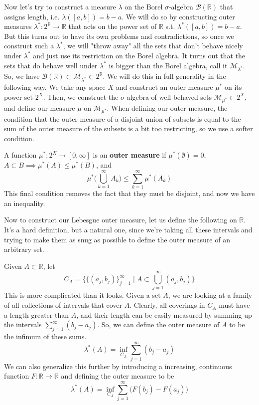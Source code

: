 \documentclass{article}
\begin{document}
Now let's try to construct a measure $\lambda$ on the Borel $\sigma$-algebra $\mathcal{B}(\mathbb{R})$ that assigns length, i.e. $\lambda([a, b]) = b - a$. We will do so by constructing outer measures $\lambda^*: 2^\mathbb{R} \longrightarrow \mathbb{R}$ that acts on the power set of $\mathbb{R}$ s.t. $\lambda^*([a, b]) = b - a$. But this turns out to have its own problems and contradictions, so once we construct such a $\lambda^*$, we will "throw away" all the sets that don't behave nicely under $\lambda^*$ and just use its restriction on the Borel algebra. It turns out that the sets that do behave well under $\lambda^*$ is bigger than the Borel algebra, call it $\mathcal{M}_{\lambda^*}$. So, we have $\mathcal{B}(\mathbb{R}) \subset \mathcal{M}_{\lambda^*} \subset 2^\mathbb{R}$. We will do this in full generality in the following way. We take any space $X$ and construct an outer measure $\mu^*$ on its power set $2^X$. Then, we construct the $\sigma$-algebra of well-behaved sets $\mathcal{M}_{\mu^*} \subset 2^X$, and define our measure $\mu$ on $\mathcal{M}_{\mu^*}$. When defining our outer measure, the condition that the outer measure of a disjoint union of subsets is equal to the sum of the outer measure of the subsets is a bit too restricting, so we use a softer condition. 

\begin{definition}
  A function $\mu^* : 2^X \longrightarrow [0, \infty]$ is an \textbf{outer measure} if $\mu^*(\emptyset) = 0$, $A \subset B \implies \mu^* (A) \leq \mu^*(B)$, and 
  \[\mu^* \bigg( \bigcup_{k=1}^\infty A_k \bigg) \leq \sum_{k=1}^\infty \mu^* (A_k)\]
  This final condition removes the fact that they must be disjoint, and now we have an inequality. 
\end{definition}

Now to construct our Lebesgue outer measure, let us define the following on $\mathbb{R}$. It's a hard definition, but a natural one, since we're taking all these intervals and trying to make them as snug as possible to define the outer measure of an arbitrary set. 

\begin{definition}
  Given $A \subset \mathbb{R}$, let 
  \[C_A = \big\{ \{(a_j, b_j)\}_{j=1}^\infty \mid A \subset \bigcup_{j=1}^\infty (a_j, b_j) \big\}\]
  This is more complicated than it looks. Given a set $A$, we are looking at a family of all collections of intervals that cover $A$. Clearly, all coverings in $C_A$ must have a length greater than $A$, and their length can be easily measured by summing up the intervals $\sum_{j=1}^\infty (b_j - a_j)$. So, we can define the outer measure of $A$ to be the infimum of these sums. 
  \[\lambda^*(A) = \inf_{C_A} \sum_{j=1}^\infty (b_j - a_j)\]
  We can also generalize this further by introducing a increasing, continuous function $F: \mathbb{R} \rightarrow \mathbb{R}$ and defining the outer measure to be 
  \[\lambda^*(A) = \inf_{C_A} \sum_{j=1}^\infty \big( F(b_j) - F(a_j) \big) \]
\end{definition}
\end{document}
